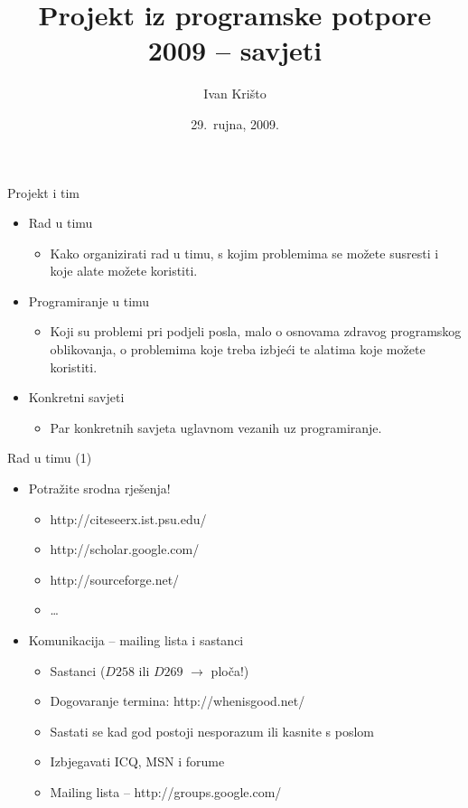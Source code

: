 \documentclass{beamer}
\title{Projekt iz programske potpore 2009 -- savjeti}
\author{Ivan Krišto}
\institute{Fakultet elektrotehnike i računarstva, Zagreb}
\date{29.~rujna, 2009.}
\begin{document}
\begin{frame}[t,plain]
\titlepage
\end{frame}

\begin{frame}[t]{Projekt i tim}
\begin{itemize}
  \item Rad u timu
  \begin{itemize}
    \item Kako organizirati rad u timu, s kojim problemima se možete susresti i
    koje alate možete koristiti.
  \end{itemize} 
  \item Programiranje u timu
  \begin{itemize}
    \item Koji su problemi pri podjeli posla, malo o osnovama zdravog
    programskog oblikovanja, o problemima koje treba izbjeći te alatima koje
    možete koristiti.
  \end{itemize}
  \item Konkretni savjeti
  \begin{itemize}
    \item Par konkretnih savjeta uglavnom vezanih uz programiranje.
  \end{itemize}
\end{itemize}
\end{frame}

\begin{frame}[t]{Rad u timu (1)}
\begin{itemize}
  \item Potražite srodna rješenja!
  \begin{itemize}
    \item http://citeseerx.ist.psu.edu/
    \item http://scholar.google.com/
    \item http://sourceforge.net/
    \item \ldots
  \end{itemize}
  \item Komunikacija -- mailing lista i sastanci
  \begin{itemize}
    \item Sastanci ($D258$ ili $D269$ $\rightarrow$ ploča!)
    \item Dogovaranje termina: http://whenisgood.net/
    \item Sastati se kad god postoji nesporazum ili kasnite s poslom
    \item Izbjegavati ICQ, MSN i forume
    \item Mailing lista -- http://groups.google.com/
  \end{itemize}
\end{itemize}
\end{frame}
\end{document}

